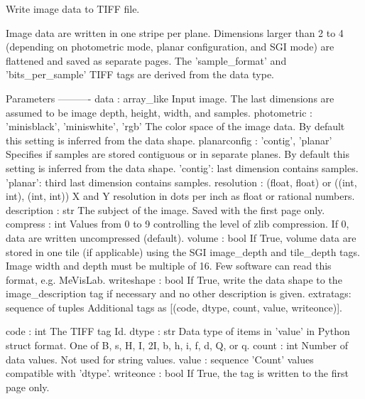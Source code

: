 \begin{DoxyVerb}Write image data to TIFF file.

Image data are written in one stripe per plane.
Dimensions larger than 2 to 4 (depending on photometric mode, planar
configuration, and SGI mode) are flattened and saved as separate pages.
The 'sample_format' and 'bits_per_sample' TIFF tags are derived from
the data type.

Parameters
----------
data : array_like
    Input image. The last dimensions are assumed to be image depth,
    height, width, and samples.
photometric : {'minisblack', 'miniswhite', 'rgb'}
    The color space of the image data.
    By default this setting is inferred from the data shape.
planarconfig : {'contig', 'planar'}
    Specifies if samples are stored contiguous or in separate planes.
    By default this setting is inferred from the data shape.
    'contig': last dimension contains samples.
    'planar': third last dimension contains samples.
resolution : (float, float) or ((int, int), (int, int))
    X and Y resolution in dots per inch as float or rational numbers.
description : str
    The subject of the image. Saved with the first page only.
compress : int
    Values from 0 to 9 controlling the level of zlib compression.
    If 0, data are written uncompressed (default).
volume : bool
    If True, volume data are stored in one tile (if applicable) using
    the SGI image_depth and tile_depth tags.
    Image width and depth must be multiple of 16.
    Few software can read this format, e.g. MeVisLab.
writeshape : bool
    If True, write the data shape to the image_description tag
    if necessary and no other description is given.
extratags: sequence of tuples
    Additional tags as [(code, dtype, count, value, writeonce)].

    code : int
The TIFF tag Id.
    dtype : str
Data type of items in 'value' in Python struct format.
One of B, s, H, I, 2I, b, h, i, f, d, Q, or q.
    count : int
Number of data values. Not used for string values.
    value : sequence
'Count' values compatible with 'dtype'.
    writeonce : bool
If True, the tag is written to the first page only.\end{DoxyVerb}
 

